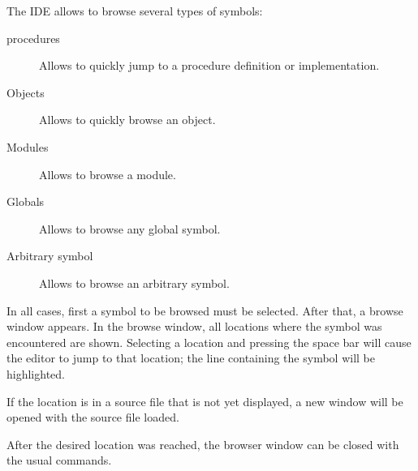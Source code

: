 The IDE allows to browse several types of symbols:
\begin{description}
\item[procedures] Allows to quickly jump to a procedure definition or
implementation.
\item[Objects] Allows to quickly browse an object.
\item[Modules] Allows to browse a module.
\item[Globals] Allows to browse any global symbol.
\item[Arbitrary symbol] Allows to browse an arbitrary symbol.
\end{description}
In all cases, first a symbol to be browsed must be selected. After that,
a browse window appears. In the browse window, all locations where the 
symbol was encountered are shown. Selecting a location and pressing the
space bar will cause the editor to jump to that location; the line
containing the symbol will be highlighted. 

If the location is in a source file that is not yet displayed, a new 
window will be opened with the source file loaded.

After the desired location was reached, the browser window can be closed 
with the usual commands. 

